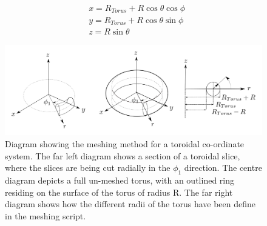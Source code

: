 \documentclass[12pt,a4paper]{article}
\begin{document}
\begin{equation}
\begin{aligned}
& x = R_{Torus} + R\cos{\theta}\cos{\phi} \\
& y = R_{Torus} + R\cos{\theta}\sin{\phi} \\
& z =  R\sin{\theta} 
\end{aligned}
\end{equation}

\begin{figure}[h!]
\centering
\includegraphics[scale=0.35]{Images//Coords/torus_coords.png}
\caption[width=\columnwidth]{Diagram showing the meshing method for a toroidal co-ordinate system. The far left diagram shows a section of a toroidal slice, where the slices are being cut radially in the $\phi_1$ direction. The centre diagram depicts a full un-meshed torus, with an outlined ring residing on the surface of the torus of radius R. The far right diagram shows how the different radii of the torus have been define in the meshing script.}
\label{tormeshin}
\end{figure}
\end{document}
